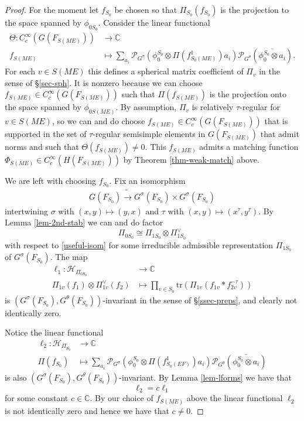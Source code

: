 \documentclass[12pt]{amsart}
\theoremstyle{remark}
\numberwithin{equation}{section}
\newcommand{\lto}{\longrightarrow}
\newcommand{\CC}{\mathbb{C}}
\theoremstyle{definition}
\numberwithin{equation}{subsection}
\begin{document}
\begin{proof}
For the moment let $f_{S_0}$ be chosen so that $\Pi_{S_0}(f_{S_0})$ is the projection to the space spanned by $\phi_{0S_0}$.  Consider the linear functional
\begin{align}
\Theta:C_c^{\infty}(G(F_{S(ME)})) &\lto \CC\\
f_{S(ME)} &\longmapsto \sum_{a_i}\mathcal{P}_{G^{\sigma}}(\phi^{S_0}_0 \otimes \Pi(f_{S_0(ME)}^1)a_{i})
\mathcal{P}_{G^{\theta}}(\overline{\phi^{S_0}_0 \otimes a_{i}}). \nonumber
\end{align}
For each $v \in S(ME)$ this defines a spherical matrix coefficient of $\Pi_v$ in the sense of \S \ref{sec-sph}.  It is nonzero because we can choose $f_{S(ME)} \in C_c^{\infty}(G(F_{S(ME)}))$ such that $\Pi(f_{S(ME)})$ is the projection onto the space spanned by $\phi_{0S(ME)}$.  By assumption, $\Pi_v$ is relatively $\tau$-regular for $v \in S(ME)$, so we can and do choose $f_{S(ME)} \in C_c^{\infty}(G(F_{S(ME)}))$ that is supported in the set of $\tau$-regular semisimple elements in $G(F_{S(ME)})$ that admit norms
and such that $\Theta(f_{S(ME)}) \neq 0$.  This $f_{S(ME)}$ admits a matching function $\Phi_{S(ME)} \in C_c^{\infty}(H(F_{S(ME)}))$ by Theorem \ref{thm-weak-match} above.

We are left with choosing $f_{S_0}$.
Fix an isomorphism
\begin{align} \label{useful-isom}
G(F_{S_0}) \tilde{\lto} G^{\sigma}(F_{S_0}) \times G^{\sigma}(F_{S_0})
\end{align}
intertwining $\sigma$ with $(x,y) \mapsto (y,x)$ and $\tau$
with $(x,y) \mapsto (x^{\tau},y^{\tau})$.  By Lemma \ref{lem-2nd-stab} we can and do factor
$$
\Pi_{0S_0} \cong \Pi_{1S_0} \otimes \Pi_{1S_0}^{\vee}
$$
with respect to \eqref{useful-isom} for some irreducible admissible representation $\Pi_{1S_0}$
of $G^{\sigma}(F_{S_0})$.  The map
\begin{align*}
\ell_1:\mathcal{H}_{\Pi_{0S_0}} &\lto \CC\\
\Pi_{1v}(f_1) \otimes \Pi_{1v}^{\vee}(f_2) &\longmapsto \prod_{v \in S_0}\mathrm{tr}\left(\Pi_{1v}(f_{1v}*f_{2v}^{-\tau} )\right)
\end{align*}
is $(G^{\sigma}(F_{S_0}),G^{\theta}(F_{S_0}))$-invariant in the sense of \S \ref{ssec-preps}, and clearly not identically zero.

Notice the linear functional
\begin{align*}
\ell_{2}: \mathcal{H}_{\Pi_{S_0}} &\lto \CC\\
\Pi(f_{S_0}) &\longmapsto \sum_{a_i}\mathcal{P}_{G^{\sigma}}(\phi^{S_0}_0 \otimes \Pi(f_{S_0(EF)}^1)a_{i})
\mathcal{P}_{G^{\theta}}(\overline{\phi^{S_0}_0 \otimes a_{i}})
\end{align*}
is also $(G^{\sigma}(F_{S_0}),G^{\theta}(F_{S_0}))$-invariant.  By Lemma \ref{lem-lforms} we have
that
$$
\ell_{2}=c\ell_1
$$
for some constant $c \in \CC$.  By our choice of $f_{S(ME)}$ above the linear functional $\ell_2$ is not identically zero and hence we have that $c \neq 0$.


\end{proof}
\end{document}
